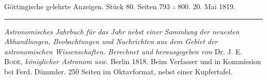 \clearpage
{}
\hypertarget{native-616-lower}{}
\begin{center}\small Göttingische gelehrte Anzeigen. Stück 80. Seiten $793\;\therefore\;800$. 20. Mai 1819.\\[3pt]\rule{.72\linewidth}{.3pt}\end{center}

\emph{Astronomisches Jahrbuch für das Jahr {} nebst einer Sammlung der neuesten Abhandlungen, Beobachtungen und Nachrichten aus dem Gebiet der astronomischen Wissenschaften. Berechnet und herausgegeben von} Dr. J. E. \textsc{Bode}, \emph{königlicher Astronom usw.} Berlin 1818. Beim Verfasser und in Kommission bei Ferd. Dümmler. 250 Seiten im Oktavformat, nebst einer Kupfertafel.

\begingroup{}\relax

